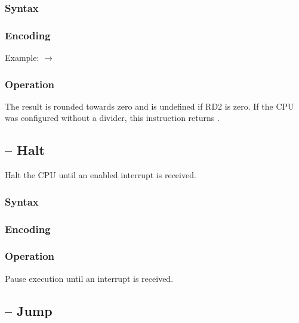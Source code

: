 \documentclass[a4paper,12pt,twoside,extrafontsizes]{memoir}
\begin{document}
{\subsubsection{Syntax}


\subsubsection{Encoding}


Example:  $\rightarrow$ 

\subsubsection{Operation}


The result is rounded towards zero and is undefined if RD2 is zero. If the CPU was configured without a divider, this instruction returns .

\subsection{ -- Halt}
\label{subsec:instr:hlt}

Halt the CPU until an enabled interrupt is received.

\subsubsection{Syntax}


\subsubsection{Encoding}


\subsubsection{Operation}

Pause execution until an interrupt is received.

\subsection{ -- Jump}
\label{subsec:instr:jmp}

}
\end{document}
